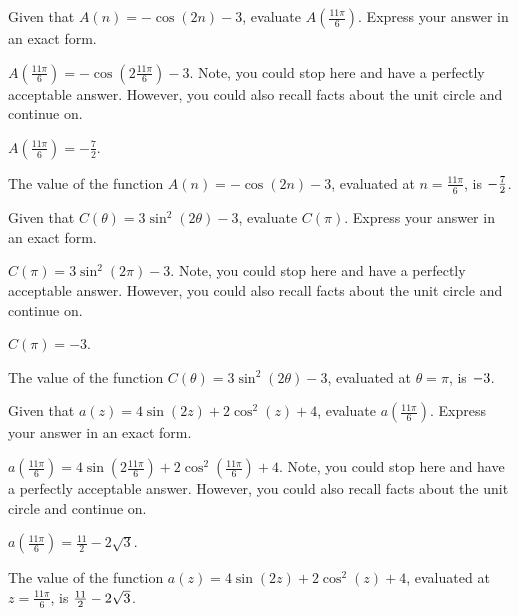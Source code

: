 \begin{shuffle}
\begin{exercise}
Given that $A(n)=-\cos (2 n)-3$, evaluate $A\left(\frac{11 \pi }{6}\right)$. Express your answer in an exact form.
\begin{solution}
\begin{hint}
$A\left(\frac{11 \pi }{6}\right)=-\cos \left(2 \frac{11 \pi }{6}\right)-3$. Note, you could stop here and have a perfectly acceptable answer. However, you could also recall facts about the unit circle and continue on. 
\end{hint}
\begin{hint}
$A\left(\frac{11 \pi }{6}\right)=-\frac{7}{2}$.
\end{hint}
The value of the function $A(n)=-\cos (2 n)-3$, evaluated at $n=\frac{11 \pi }{6}$, is ${-\frac{7}{2}}$.
\end{solution}
\end{exercise}

\begin{exercise}
Given that $C(\theta)=3 \sin ^2(2 \theta )-3$, evaluate $C\left(\pi\right)$. Express your answer in an exact form.
\begin{solution}
\begin{hint}
$C\left(\pi\right)=3 \sin ^2\left(2 \pi\right)-3$. Note, you could stop here and have a perfectly acceptable answer. However, you could also recall facts about the unit circle and continue on. 
\end{hint}
\begin{hint}
$C\left(\pi\right)=-3$.
\end{hint}
The value of the function $C(\theta)=3 \sin ^2(2 \theta )-3$, evaluated at $\theta=\pi$, is ${-3}$.
\end{solution}
\end{exercise}

\begin{exercise}
Given that $a(z)=4 \sin (2 z)+2 \cos ^2(z)+4$, evaluate $a\left(\frac{11 \pi }{6}\right)$. Express your answer in an exact form.
\begin{solution}
\begin{hint}
$a\left(\frac{11 \pi }{6}\right)=4 \sin \left(2 \frac{11 \pi }{6}\right)+2 \cos ^2\left(\frac{11 \pi }{6}\right)+4$. Note, you could stop here and have a perfectly acceptable answer. However, you could also recall facts about the unit circle and continue on. 
\end{hint}
\begin{hint}
$a\left(\frac{11 \pi }{6}\right)=\frac{11}{2}-2 \sqrt{3}$.
\end{hint}
The value of the function $a(z)=4 \sin (2 z)+2 \cos ^2(z)+4$, evaluated at $z=\frac{11 \pi }{6}$, is ${\frac{11}{2}-2 \sqrt{3}}$.
\end{solution}
\end{exercise}


\end{shuffle}
